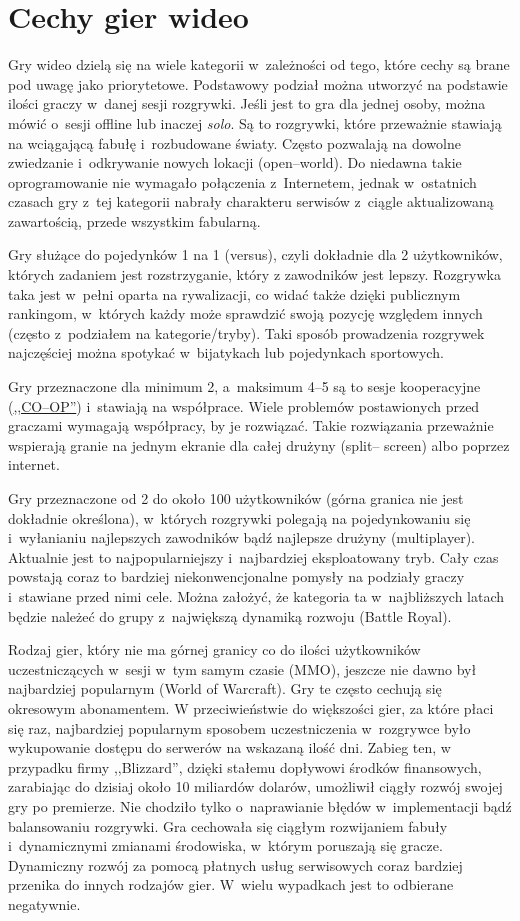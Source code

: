 \documentclass[brudnopis]{xmgr}
\begin{document}
\section{Cechy gier wideo}
Gry wideo dzielą się na wiele kategorii w~zależności od tego, które cechy są
brane pod uwagę jako priorytetowe. Podstawowy podział można utworzyć na
podstawie ilości graczy w~danej sesji rozgrywki.
Jeśli jest to gra dla jednej osoby, można mówić o~sesji
offline lub inaczej {\em solo}. Są to rozgrywki, które przeważnie stawiają na
wciągającą fabułę i~rozbudowane światy. Często pozwalają na dowolne
zwiedzanie i~odkrywanie nowych lokacji (open--world). Do niedawna takie oprogramowanie nie wymagało
połączenia z~Internetem, jednak w~ostatnich czasach gry z~tej kategorii
nabrały charakteru serwisów z~ciągle aktualizowaną zawartością, przede wszystkim fabularną.

Gry służące do pojedynków 1 na 1 (versus), czyli
dokładnie dla 2 użytkowników, których zadaniem jest rozstrzyganie, który z
zawodników jest lepszy. Rozgrywka taka jest w~pełni oparta na rywalizacji, co widać także
dzięki publicznym rankingom, w~których każdy może sprawdzić swoją pozycję
względem innych (często z~podziałem na kategorie/tryby). Taki sposób
prowadzenia rozgrywek najczęściej można spotykać w~bijatykach lub pojedynkach sportowych.

Gry przeznaczone dla minimum 2, a~maksimum 4--5 są to
sesje kooperacyjne (\hyperref[slownik]{,,CO--OP''}) i~stawiają na współprace. Wiele problemów
postawionych przed graczami wymagają współpracy, by je rozwiązać. Takie
rozwiązania przeważnie wspierają granie na jednym ekranie dla całej drużyny (split--
screen) albo poprzez internet.

Gry przeznaczone od 2 do około 100 użytkowników (górna
granica nie jest dokładnie określona), w~których rozgrywki polegają na
pojedynkowaniu się i~wyłanianiu najlepszych zawodników bądź najlepsze
drużyny (multiplayer). Aktualnie jest to najpopularniejszy i~najbardziej
eksploatowany tryb. Cały czas powstają coraz to bardziej
niekonwencjonalne pomysły na podziały graczy i~stawiane przed nimi cele.
Można założyć, że kategoria ta w~najbliższych latach będzie należeć do
grupy z~największą dynamiką rozwoju (Battle Royal).

Rodzaj gier, który nie ma górnej granicy co do ilości
użytkowników uczestniczących w~sesji w~tym samym czasie (MMO), jeszcze nie dawno był najbardziej popularnym (World of
Warcraft). Gry te często cechują się okresowym abonamentem. W
przeciwieństwie do większości gier, za które płaci się raz, najbardziej
popularnym sposobem uczestniczenia w~rozgrywce było wykupowanie dostępu do
serwerów na wskazaną ilość dni. Zabieg ten, w przypadku firmy ,,Blizzard'', dzięki stałemu dopływowi środków
finansowych, zarabiając do dzisiaj około 10 miliardów dolarów, umożliwił ciągły rozwój
swojej gry po premierze. Nie chodziło tylko o~naprawianie błędów w~implementacji
bądź balansowaniu rozgrywki. Gra cechowała się ciągłym  rozwijaniem fabuły i~dynamicznymi zmianami
środowiska, w~którym poruszają się gracze. Dynamiczny rozwój za pomocą płatnych usług serwisowych coraz bardziej przenika do innych rodzajów gier. W~wielu wypadkach jest to odbierane negatywnie.
\end{document}
